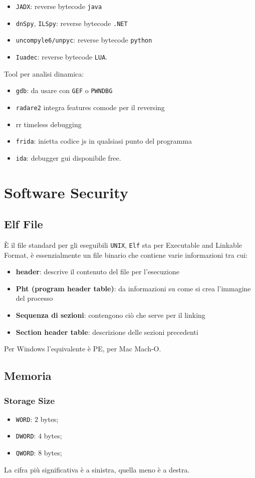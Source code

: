 \documentclass[oneside,a4paper,11pt]{book}
\theoremstyle{italicstyle}
\theoremstyle{normStyle}
\begin{document}
\begin{itemize}
\item \texttt{JADX}: reverse bytecode \texttt{java}
\item \texttt{dnSpy}, \texttt{ILSpy}: reverse bytecode \texttt{.NET}
\item \texttt{uncompyle6/unpyc}: reverse bytecode \texttt{python}
\item \texttt{Iuadec}: reverse bytecode \texttt{LUA}.
\end{itemize}
Tool per analisi dinamica:
\begin{itemize}
\item \texttt{gdb}: da usare con \texttt{GEF} o \texttt{PWNDBG}
\item \texttt{radare2} integra features comode per il reversing
\item rr timeless debugging
\item \texttt{frida}: inietta codice js in qualsiasi punto del programma
\item \texttt{ida}: debugger gui disponibile free.
\end{itemize}

\chapter{Software Security}
\section{Elf File}
È il file standard per gli eseguibili \texttt{UNIX}, \texttt{Elf} sta per
Executable and Linkable Format, è essenzialmente un file binario che
contiene varie informazioni tra cui:
\begin{itemize}
	\item \textbf{header}: descrive il contenuto del file per l'esecuzione
	\item \textbf{Pht (program header table)}: da informazioni su come si crea
    l'immagine del processo
	\item \textbf{Sequenza di sezioni}: contengono ciò che serve per il linking
	\item \textbf{Section header table}: descrizione delle sezioni precedenti 
\end{itemize}
Per Windows l'equivalente è PE, per Mac Mach-O.
\section{Memoria}
\subsection{Storage Size}
\begin{itemize}
    \item \texttt{WORD}: $2$ bytes;
    \item \texttt{DWORD}: $4$ bytes;
    \item \texttt{QWORD}: $8$ bytes;
\end{itemize}
La cifra più significativa è a sinistra, quella meno è a destra.
\end{document}

